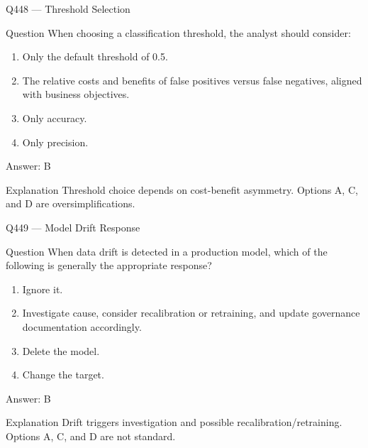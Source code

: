 \documentclass[aspectratio=169,8pt]{beamer}
\begin{document}
	\begin{frame}{Q448 --- Threshold Selection}
		\begin{block}{Question}
			When choosing a classification threshold, the analyst should consider:
			\begin{enumerate}
				\item Only the default threshold of 0.5.
				\item The relative costs and benefits of false positives versus false negatives, aligned with business objectives.
				\item Only accuracy.
				\item Only precision.
			\end{enumerate}
		\end{block}
		\begin{exampleblock}{Answer: B}\end{exampleblock}
		\begin{block}{Explanation}
			Threshold choice depends on cost-benefit asymmetry. Options A, C, and D are oversimplifications.
		\end{block}
	\end{frame}
	
	\begin{frame}{Q449 --- Model Drift Response}
		\begin{block}{Question}
			When data drift is detected in a production model, which of the following is generally the appropriate response?
			\begin{enumerate}
				\item Ignore it.
				\item Investigate cause, consider recalibration or retraining, and update governance documentation accordingly.
				\item Delete the model.
				\item Change the target.
			\end{enumerate}
		\end{block}
		\begin{exampleblock}{Answer: B}\end{exampleblock}
		\begin{block}{Explanation}
			Drift triggers investigation and possible recalibration/retraining. Options A, C, and D are not standard.
		\end{block}
	\end{frame}
	
\end{document}
